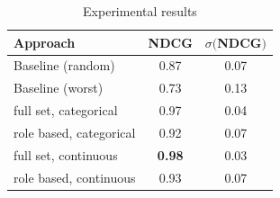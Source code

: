\begin{table}
	\caption{Experimental results}
	\label{tab:freq}
	\begin{tabular}{lcc}
		\toprule
		Approach & NDCG & $\sigma ($NDCG$)$\\
		\midrule
		Baseline (random) & 0.87 & 0.07\\
		Baseline (worst) & 0.73 & 0.13\\
		\midrule
		full set, categorical & 0.97 & 0.04 \\
		role based, categorical & 0.92 & 0.07  \\
		full set, continuous & \textbf{0.98} & 0.03 \\
		role based, continuous & 0.93 & 0.07 \\
		\bottomrule
	\end{tabular}
\end{table}
%
%
